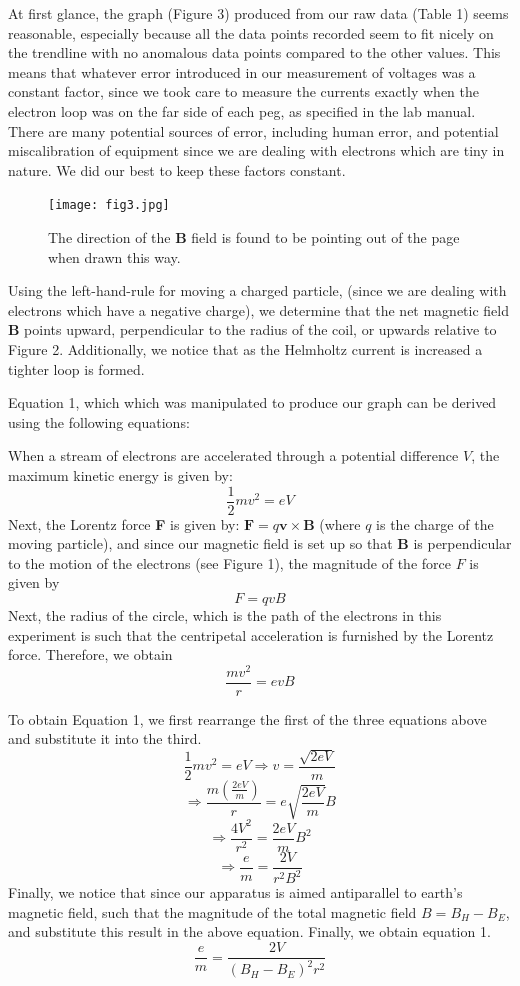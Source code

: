 \documentclass[letterpaper]{article}
\begin{document}
At first glance, the graph (Figure 3) produced from our raw data (Table 1) seems reasonable, especially
because all the data points recorded seem to fit nicely on the trendline with
no anomalous data points compared to the other values. This means that whatever error
introduced in our measurement of voltages was a constant factor, since we took care
to measure the currents exactly when the electron loop was on the far side of each peg, as specified in the
lab manual. There are many potential sources of error, including human error, and potential miscalibration of equipment since we are dealing
with electrons which are tiny in nature. We did our best to keep these factors constant.

\begin{figure}[H]
  \centering
  \texttt{[image: fig3.jpg]}
  \caption{The direction of the \textbf{B} field is found to be pointing out of the page when drawn this way.}
\end{figure}

Using the left-hand-rule for moving a charged particle, (since we are
dealing with electrons which have a negative charge), we determine that the net magnetic field \textbf{B}
points upward, perpendicular to the radius of the coil, or upwards relative to Figure 2. Additionally, we notice that
as the Helmholtz current is increased a tighter loop is formed.

Equation 1, which which was manipulated to produce our graph can be derived using the following equations:

\noindent When a stream of electrons are accelerated through a potential difference $V$, the maximum
kinetic energy is given by:
$$\frac{1}{2}mv^2 = eV$$
Next, the Lorentz force \textbf{F} is given by:
$\textbf{F}=q\textbf{v}\times \textbf{B}$
(where $q$ is the charge of the moving particle), and since our magnetic field is set up so that \textbf{B} is perpendicular to the motion of the electrons (see Figure 1),
the magnitude of the force $F$ is given by $$F=qvB$$
Next, the radius of the circle, which is the path of the electrons in this experiment is such that
the centripetal acceleration is furnished by the Lorentz force. Therefore, we obtain $$\frac{mv^2}{r}=evB$$

\noindent To obtain Equation 1, we first rearrange the first of the three equations above and substitute it into the third.
$$\frac{1}{2}mv^2 = eV \Rightarrow v=\frac{\sqrt{2eV}}{m}$$
$$\Rightarrow \frac{m(\frac{2eV}{m})}{r}=e\sqrt{\frac{2eV}{m}}B$$
$$\Rightarrow \frac{4V^2}{r^2}=\frac{2eV}{m}B^2$$
$$\Rightarrow \frac{e}{m} = \frac{2V}{r^2B^2}$$
Finally, we notice that since our apparatus is aimed antiparallel to earth's magnetic field, such that
the magnitude of the total magnetic field $B=B_H-B_E$, and substitute this result in the above equation.
Finally, we obtain equation 1.
$$\frac{e}{m} = \frac{2V}{(B_H-B_E)^2r^2}$$
\end{document}
